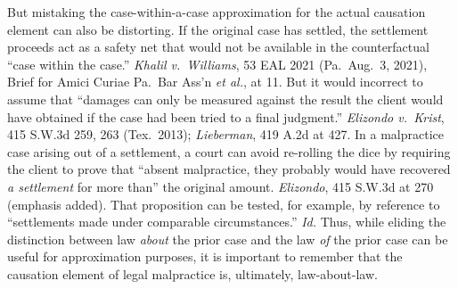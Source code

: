 \documentclass[
  12pt,
  letterpaper,
]{scrartcl}
\begin{document}
But mistaking the case-within-a-case approximation for the actual causation
element can also be distorting. If the original case has settled, the settlement
proceeds act as a safety net that would not be available in the counterfactual
``case within the case.'' \textit{Khalil
v.~Williams}, 53 EAL 2021 (Pa.~Aug.~3, 2021), Brief for Amici Curiae Pa.~Bar
Ass'n \textit{et al.}, at 11. But it would incorrect to assume that ``damages can only be measured against the result the
client would have obtained if the case had been tried to a final judgment.''
\textit{Elizondo v.~Krist}, 415 S.W.3d 259, 263 (Tex.~2013);
\textit{Lieberman}, 419 A.2d at 427. In a malpractice case arising out of a
settlement, a court can avoid re-rolling the dice by requiring the client to
prove that ``absent malpractice, they probably would have recovered \emph{a
settlement} for more than'' the original amount. \textit{Elizondo}, 415 S.W.3d
at 270 (emphasis added). That proposition can be tested, for example, by
reference to ``settlements made under comparable circumstances.'' \textit{Id.}
Thus, while eliding the distinction between law \textit{about} the prior case
and the law \textit{of} the prior case can be useful for approximation
purposes, it is important to remember that the causation element of legal
malpractice is, ultimately, law-about-law.
\end{document}
